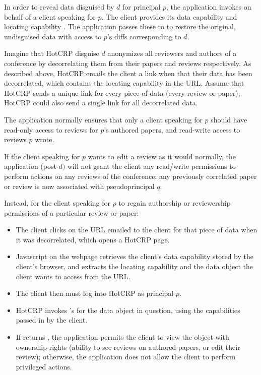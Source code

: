 In order to reveal data disguised by $d$ for principal $p$, the application invokes
 on behalf of a client speaking for $p$. The client provides its data capability
 and locating capability . The application passes these to \sys to restore the
original, undisguised data with access to $p$'s diffs corresponding to $d$.


Imagine that HotCRP disguise $d$ anonymizes all reviewers and authors of a conference by
decorrelating them from their papers and reviews respectively. As described above, HotCRP emails the
client a link when that their data has been decorrelated, which contains the locating
capability in the URL. Assume that HotCRP sends a unique link for every piece of data (\eg every review
or paper); HotCRP could also send a single link for all decorrelated data.

The application normally ensures that only a client speaking for $p$ should have read-only access to
reviews for $p$'s authored papers, and read-write access to reviews $p$ wrote.

If the client speaking for $p$ wants to edit a review as it would normally, the application
(post-$d)$ will not grant the client any read/write permissions to perform actions on any reviews of
the conference: any previously correlated paper or review is now associated with pseudoprincipal
$q$.  

Instead, for the client speaking for $p$ to regain authorship or reviewership permissions of a
particular review or paper:
\begin{itemize}
    \item The client clicks on the URL emailed to the client for that piece of data when it was decorrelated, which
        opens a HotCRP page.
    \item Javascript on the webpage retrieves the client's data capability
        stored by the client's browser, and extracts the locating capability and the data object the client
        wants to access from the URL.
    \item The client then must log into HotCRP as principal $p$.
    \item HotCRP invokes \sys's  for the data object in question,
        using the capabilities passed in by the client.
    \item If \sys returns , the application permits the client to view the object with ownership
        rights (\eg ability to see reviews on authored papers, or edit their review); otherwise, the
        application does not allow the client to perform privileged actions.
\end{itemize}


